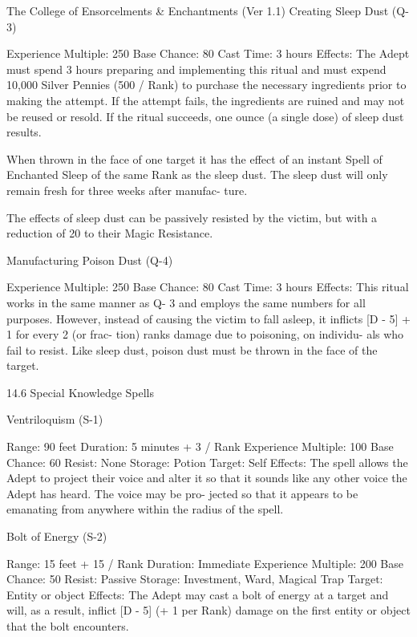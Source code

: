 \begin{Chapter}{The College of Ensorcelments \& Enchantments (Ver 1.1)}
Creating Sleep Dust (Q-3) 

Experience Multiple: 250 
Base Chance: 80%
Cast Time: 3 hours 
Effects:  The  Adept  must  spend  3  hours  preparing 
and  implementing  this  ritual  and  must  expend 
10,000 Silver Pennies (500 / Rank) to purchase the 
necessary  ingredients  prior  to  making  the  attempt. 
If  the  attempt  fails,  the  ingredients  are  ruined  and 
may not be reused or resold. If the ritual succeeds, 
one ounce (a single dose) of sleep dust results. 

When  thrown  in  the  face  of  one  target  it  has  the 
effect of an instant Spell of Enchanted Sleep of the 
same  Rank  as  the  sleep  dust.  The  sleep  dust  will 
only  remain  fresh  for  three  weeks  after  manufac-
ture. 

The  effects  of  sleep  dust  can be  passively  resisted 
by  the  victim,  but  with  a  reduction  of  20  to  their 
Magic Resistance. 

Manufacturing Poison Dust (Q-4) 

Experience Multiple: 250 
Base Chance: 80%
Cast Time: 3 hours 
Effects: This ritual works in the same manner as Q-
3 and employs the same numbers for all purposes. 
However,  instead  of  causing  the  victim  to  fall 
asleep,  it  inflicts  [D  -  5]  +  1  for  every  2  (or  frac-
tion)  ranks  damage  due  to poisoning,  on  individu-
als  who  fail  to  resist.  Like  sleep  dust,  poison  dust 
must be thrown in the face of the target. 

14.6 Special Knowledge Spells 

Ventriloquism (S-1) 

Range: 90 feet 
Duration: 5 minutes + 3 / Rank 
Experience Multiple: 100 
Base Chance: 60%
Resist: None 
Storage: Potion 
Target: Self 
Effects: The spell allows the Adept to project their 
voice  and  alter  it  so  that  it  sounds  like  any  other 
voice the Adept has heard. The voice may be pro-
jected  so  that  it  appears  to  be  emanating  from 
anywhere within the radius of the spell. 

Bolt of Energy (S-2) 

Range: 15 feet + 15 / Rank 
Duration: Immediate 
Experience Multiple: 200 
Base Chance: 50%
Resist: Passive 
Storage: Investment, Ward, Magical Trap 
Target: Entity or object 
Effects:  The  Adept  may  cast  a  bolt  of  energy  at  a 
target  and  will,  as  a  result,  inflict  [D  -  5]  (+ 1 per 
Rank) damage on the first entity or object that the 
bolt encounters. 


\end{Chapter}
